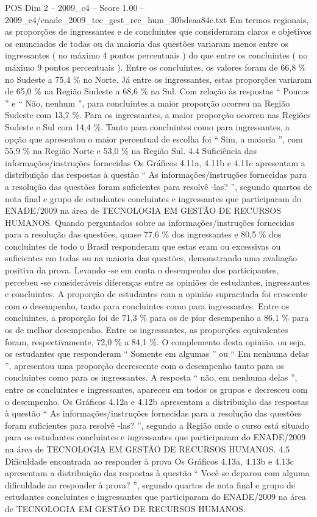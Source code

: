 \begin{textsample}{POS Dim 2 – 2009\_c4 – Score 1.00 – 2009\_c4/enade\_2009\_tec\_gest\_rec\_hum\_30bdeaa84c.txt}
Em termos regionais, as proporções de ingressantes e de concluintes que consideraram claros e objetivos os enunciados de todas ou da maioria das questões variaram menos entre os ingressantes ( no máximo 4 pontos percentuais ) do que entre os concluintes ( no máximo 9 pontos percentuais ).
Entre os concluintes, os valores foram de 66,8 \% no Sudeste a 75,4 \% no Norte.
Já entre os ingressantes, estas proporções variaram de 65,0 \% na Região Sudeste a 68,6 \% na Sul.
Com relação às respostas “ Poucos ” e “ Não, nenhum ”, para concluintes a maior proporção ocorreu na Região Sudeste com 13,7 \%.
Para os ingressantes, a maior proporção ocorreu nas Regiões Sudeste e Sul com 14,4 \%.
Tanto para concluintes como para ingressantes, a opção que apresentou o maior percentual de escolha foi “ Sim, a maioria ”, com 55,9 \% na Região Norte e 53,0 \% na Região Sul. 4.4 Suficiência das informações/instruções fornecidas Os Gráficos 4.11a, 4.11b e 4.11c apresentam a distribuição das respostas à questão “ As informações/instruções fornecidas para a resolução das questões foram suficientes para resolvê -las? ”, segundo quartos de nota final e grupo de estudantes concluintes e ingressantes que participaram do ENADE/2009 na área de TECNOLOGIA EM GESTÃO DE RECURSOS HUMANOS.
Quando perguntados sobre as informações/instruções fornecidas para a resolução das questões, quase 77,6 \% dos ingressantes e 80,5 \% dos concluintes de todo o Brasil responderam que estas eram ou excessivas ou suficientes em todas ou na maioria das questões, demonstrando uma avaliação positiva da prova.
Levando -se em conta o desempenho dos participantes, percebeu -se consideráveis diferenças entre as opiniões de estudantes, ingressantes e concluintes.
A proporção de estudantes com a opinião supracitada foi crescente com o desempenho, tanto para concluintes como para ingressantes.
Entre os concluintes, a proporção foi de 71,3 \% para os de pior desempenho a 86,1 \% para os de melhor desempenho.
Entre os ingressantes, as proporções equivalentes foram, respectivamente, 72,0 \% a 84,1 \%.
O complemento desta opinião, ou seja, os estudantes que responderam “ Somente em algumas ” ou “ Em nenhuma delas ”, apresentou uma proporção decrescente com o desempenho tanto para os concluintes como para os ingressantes.
A resposta “ não, em nenhuma delas ”, entre os concluintes e ingressantes, apareceu em todos os grupos e decresceu com o desempenho.
Os Gráficos 4.12a e 4.12b apresentam a distribuição das respostas à questão “ As informações/instruções fornecidas para a resolução das questões foram suficientes para resolvê -las? ”, segundo a Região onde o curso está situado para os estudantes concluintes e ingressantes que participaram do ENADE/2009 na área de TECNOLOGIA EM GESTÃO DE RECURSOS HUMANOS. 4.5 Dificuldade encontrada ao responder à prova Os Gráficos 4.13a, 4.13b e 4.13c apresentam a distribuição das respostas à questão “ Você se deparou com alguma dificuldade ao responder à prova? ”, segundo quartos de nota final e grupo de estudantes concluintes e ingressantes que participaram do ENADE/2009 na área de TECNOLOGIA EM GESTÃO DE RECURSOS HUMANOS.

\end{textsample}
